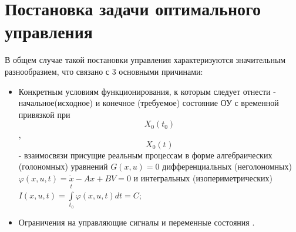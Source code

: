 \documentclass[preprint,russian,a5paper,10pt,twoside]{ncc}
\begin{document}
\newpage

\section{Постановка задачи оптимального управления\label{task}}
В общем случае такой постановки управления характеризуются значительным разнообразием, что связано с 3 основными причинами:

\begin{itemize}
\item Конкретным условиям функционирования, к которым следует отнести - начальное(исходное) и конечное (требуемое) состояние ОУ с временной привязкой при \[{{X}_{0}}\left( {{t}_{0}} \right)\], \[{{X}_{0}}\left( {{t}_{}} \right)\] - взаимосвязи присущие реальным процессам в форме алгебраических (голономных) уравнений $G\left( x,u \right)=0$ дифференциальных (неголономных) $\varphi \left( x,u,t \right)=\dot{x}-Ax+BV=0$ и интегральных (изопериметрических) $I\left( x,u,t \right)=\int\limits_{{{t}_{0}}}^{{{t}_{}}}{\varphi \left( x,u,t \right)dt=C}$;
\item Ограничения на управляющие сигналы и переменные состояния .
\end{itemize}
\par
\end{document}
